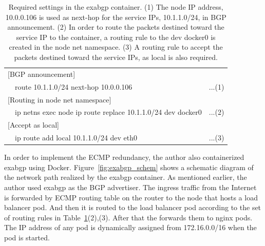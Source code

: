 \begin{table}
  \centering
  \begin{tabular}{lllr}
    \hline 
      \multicolumn{4}{l}{[BGP announcement]} \\
      \hspace{15 mm} & \multicolumn{2}{l}{route 10.1.1.0/24 next-hop 10.0.0.106} & ...(1) \\
      \multicolumn{4}{l}{[Routing in node net namespace]} \\
      \hspace{15 mm} & \multicolumn{2}{l}{ip netns exec node ip route replace 10.1.1.0/24 dev docker0} & ...(2) \\
      \multicolumn{4}{l}{[Accept as local]} \\
      \hspace{15 mm} & \multicolumn{2}{l}{ip route add local 10.1.1.0/24 dev eth0} & ...(3) \\
      \hline
  \end{tabular}
  
  \par\bigskip
  \centering
  \begin{minipage}{0.9\columnwidth}
    \caption[Required settings in the exabgp container]{
      Required settings in the exabgp container.
      (1) The node IP address, 10.0.0.106 is used as next-hop for the service IPs, 10.1.1.0/24, in BGP announcement.
      (2) In order to route the packets destined toward the service IP to the container, a routing rule to the dev docker0 is created in the node net namespace. 
      (3) A routing rule to accept the packets destined toward the service IPs,  as local is also required.
    }
    \label{table:exabgp_setting}
  \end{minipage}

\end{table}

In order to implement the ECMP redundancy, the author also containerized exabgp using Docker.
Figure~\ref{fig:exabgp_schem} shows a schematic diagram of the network path realized by the exabgp container.
As mentioned earlier, the author used exabgp as the BGP advertiser. 
The ingress traffic from the Internet is forwarded by ECMP routing table on the router to the node that hosts a load balancer pod.
And then it is routed to the load balancer pod according to the set of routing rules in Table~\ref{table:exabgp_setting}(2),(3).
After that the  forwards them to nginx pods.
The IP address of any pod is dynamically assigned from 172.16.0.0/16 when the pod is started. 

